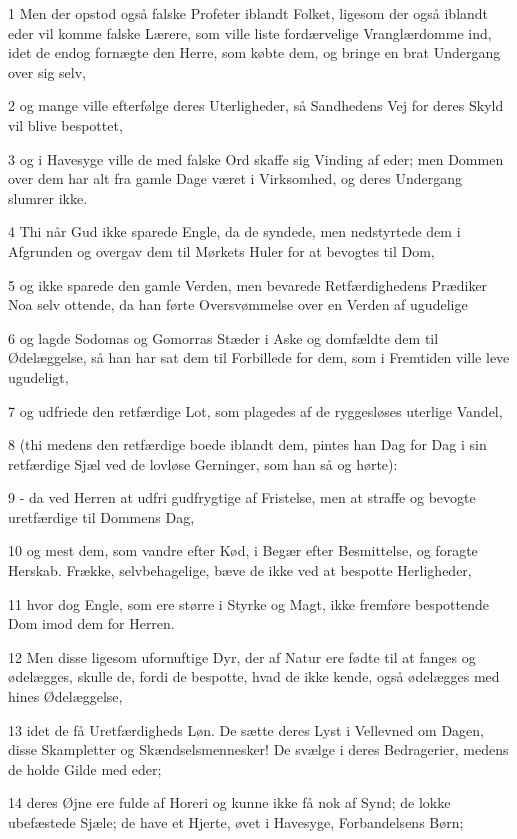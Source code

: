 \par 1 Men der opstod også falske Profeter iblandt Folket, ligesom der også iblandt eder vil komme falske Lærere, som ville liste fordærvelige Vranglærdomme ind, idet de endog fornægte den Herre, som købte dem, og bringe en brat Undergang over sig selv,
\par 2 og mange ville efterfølge deres Uterligheder, så Sandhedens Vej for deres Skyld vil blive bespottet,
\par 3 og i Havesyge ville de med falske Ord skaffe sig Vinding af eder; men Dommen over dem har alt fra gamle Dage været i Virksomhed, og deres Undergang slumrer ikke.
\par 4 Thi når Gud ikke sparede Engle, da de syndede, men nedstyrtede dem i Afgrunden og overgav dem til Mørkets Huler for at bevogtes til Dom,
\par 5 og ikke sparede den gamle Verden, men bevarede Retfærdighedens Prædiker Noa selv ottende, da han førte Oversvømmelse over en Verden af ugudelige
\par 6 og lagde Sodomas og Gomorras Stæder i Aske og domfældte dem til Ødelæggelse, så han har sat dem til Forbillede for dem, som i Fremtiden ville leve ugudeligt,
\par 7 og udfriede den retfærdige Lot, som plagedes af de ryggesløses uterlige Vandel,
\par 8 (thi medens den retfærdige boede iblandt dem, pintes han Dag for Dag i sin retfærdige Sjæl ved de lovløse Gerninger, som han så og hørte):
\par 9 - da ved Herren at udfri gudfrygtige af Fristelse, men at straffe og bevogte uretfærdige til Dommens Dag,
\par 10 og mest dem, som vandre efter Kød, i Begær efter Besmittelse, og foragte Herskab. Frække, selvbehagelige, bæve de ikke ved at bespotte Herligheder,
\par 11 hvor dog Engle, som ere større i Styrke og Magt, ikke fremføre bespottende Dom imod dem for Herren.
\par 12 Men disse ligesom ufornuftige Dyr, der af Natur ere fødte til at fanges og ødelægges, skulle de, fordi de bespotte, hvad de ikke kende, også ødelægges med hines Ødelæggelse,
\par 13 idet de få Uretfærdigheds Løn. De sætte deres Lyst i Vellevned om Dagen, disse Skampletter og Skændselsmennesker! De svælge i deres Bedragerier, medens de holde Gilde med eder;
\par 14 deres Øjne ere fulde af Horeri og kunne ikke få nok af Synd; de lokke ubefæstede Sjæle; de have et Hjerte, øvet i Havesyge, Forbandelsens Børn;
